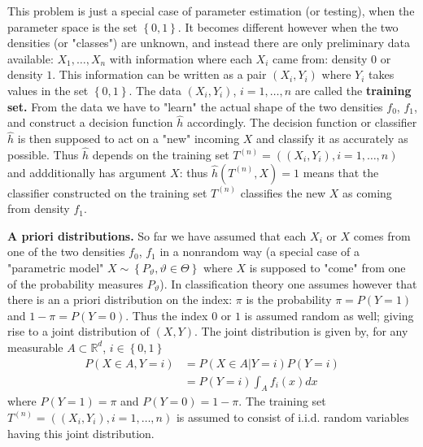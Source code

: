 \documentclass[11pt,twoside]{article}%
\theoremstyle{change}
\begin{document}
This problem is just a special case of parameter estimation (or testing), when
the parameter space is the set $\left\{  0,1\right\}  $. It becomes different
however when the two densities (or "classes") are unknown, and instead there
are only preliminary data available: $X_{1},\ldots,X_{n}$ with information
where each $X_{i}$ came from: density $0$ or density $1$. This information can
be written as a pair $\left(  X_{i},Y_{i}\right)  $ where $Y_{i}$ takes values
in the set $\left\{  0,1\right\}  $. The data $\left(  X_{i},Y_{i}\right)  $,
$i=1,\ldots,n$ are called the \textbf{training set.} From the data we have to
"learn" the actual shape of the two densities $f_{0} $, $f_{1}$, and construct
a decision function $\hat{h}$ accordingly. The decision function or classifier
$\hat{h}$ is then supposed to act on a "new" incoming $X$ and classify it as
accurately as possible. Thus $\hat{h}$ depends on the training set
$T^{(n)}=\left(  \left(  X_{i},Y_{i}\right)  ,i=1,\ldots,n\right)  $ and
addditionally has argument $X$: thus $\hat{h}\left(  T^{(n)},X\right)  =1$
means that the classifier constructed on the training set $T^{(n)}$ classifies
the new $X$ as coming from density $f_{1}$.

\bigskip

\textbf{A priori distributions. }So far we have assumed that each $X_{i}$ or
$X$ comes from one of the two densities $f_{0}$, $f_{1}$ in a nonrandom way (a
special case of a "parametric model" $X\sim\left\{  P_{\vartheta},\vartheta
\in\Theta\right\}  $ where $X$ is supposed to "come" from one of the
probability measures $P_{\vartheta}$). In classification theory one assumes
however that there is an a priori distribution on the index: $\pi$ is the
probability $\pi=P\left(  Y=1\right)  $ and $1-\pi=P\left(  Y=0\right)  $.
Thus the index $0$ or $1$ is assumed random as well; giving rise to a joint
distribution of $\left(  X,Y\right)  $. The joint distribution is given by,
for any measurable $A\subset\mathbb{R}^{d}$, $i\in\left\{  0,1\right\}  $
\begin{align*}
P\left(  X\in A,Y=i\right)   & =P\left(  X\in A|Y=i\right)  P\left(
Y=i\right) \\
& =P\left(  Y=i\right)  \int_{A}f_{i}(x)dx
\end{align*}
where $P\left(  Y=1\right)  =\pi$ and $P\left(  Y=0\right)  =1-\pi$. The
training set $T^{(n)}=\left(  \left(  X_{i},Y_{i}\right)  ,i=1,\ldots
,n\right)  $ is assumed to consist of i.i.d. random variables having this
joint distribution.

\bigskip
\end{document}
